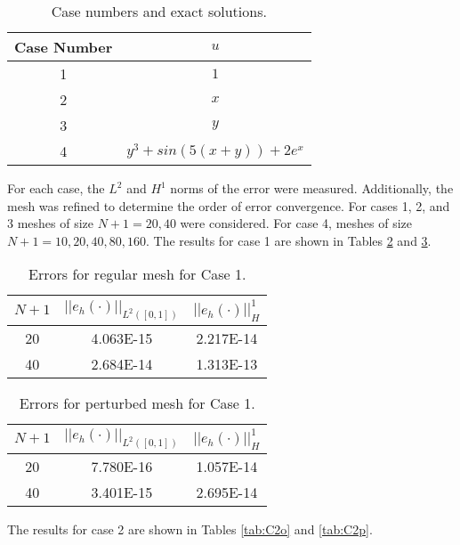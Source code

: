 \documentclass[a4paper, 12pt]{article}
\begin{document}
\begin{table}[!ht]
\caption{ Case numbers and exact solutions.}
\vspace{0.1in}
\centering
\begin{tabular}{ |c|c|}
  \hline
  Case Number  & $u$ \\
  \hline
  1            &  $1$ \\
  \hline
  2            &  $x$ \\
  \hline
  3            &  $y$ \\
  \hline
  4            &  $y^3 + sin( 5(x+y)) + 2e^x$ \\
  \hline
\end{tabular}
\label{t:cases}
\end{table}

\noindent
For each case, the $L^2$ and $H^1$ norms of the error were measured. 
Additionally, the mesh was refined to determine the order of 
error convergence. For cases 1, 2, and 3 meshes of size $N+1 = 20, 40$
were considered. For case 4, meshes of size $N+1 = 10, 20, 40, 80, 160$.
The results for case 1 are shown in Tables \ref{tab:C1o}
and \ref{tab:C1p}.

\begin{table}[!ht]
\caption{Errors for regular mesh for Case 1.}
\vspace{0.1in}
\centering
\begin{tabular}{|c|c|c|}
\hline
 $N+1$&  $||e_h(\cdot)||_{L^2([0,1])}$ & $||e_h(\cdot)||_H^1$ \\
 \hline
     20  & 4.063E-15 & 2.217E-14 \\
     40  & 2.684E-14 & 1.313E-13 \\
\hline
\end{tabular}
\label{tab:C1o}
\end{table}

\begin{table}[!ht]
\caption{Errors for perturbed mesh for Case 1.}
\vspace{0.1in}
\centering
\begin{tabular}{|c|c|c|}
\hline
 $N+1$  & $||e_h(\cdot)||_{L^2([0,1])}$ & $||e_h(\cdot)||_H^1$ \\
 \hline
     20  & 7.780E-16 & 1.057E-14 \\
     40  & 3.401E-15 & 2.695E-14 \\
\hline
\end{tabular}
\label{tab:C1p}
\end{table}

The results for case 2 are shown in Tables \ref{tab:C2o}
and \ref{tab:C2p}.
\end{document}
